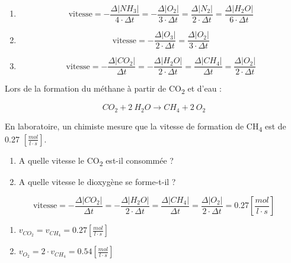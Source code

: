 \documentclass[
  11pt,
  a4paper,
  openany]{book}
\begin{document}
\begin{Answer}

\begin{enumerate}
\def\labelenumi{\arabic{enumi}.}
\item
  \[
  \text{vitesse} = - \frac{\Delta |NH_3|}{4 \cdot \Delta t} = - \frac{\Delta |O_2|}{3 \cdot \Delta t} = \frac{\Delta |N_2|}{2 \cdot \Delta t} = \frac{\Delta |H_2O|}{6 \cdot \Delta t}
  \]
\item
  \[
  \text{vitesse} = - \frac{\Delta |O_3|}{2 \cdot \Delta t} = \frac{\Delta |O_2|}{3 \cdot \Delta t}
  \]
\item
  \[
  \text{vitesse} = - \frac{\Delta |CO_2|}{\Delta t} = - \frac{\Delta |H_2O|}{2 \cdot \Delta t} = \frac{\Delta |CH_4|}{\Delta t} = \frac{\Delta |O_2|}{2 \cdot \Delta t}
  \]
\end{enumerate}

\end{Answer}

\begin{Exercise}

Lors de la formation du méthane à partir de CO\textsubscript{2} et d'eau :

\[ CO_2 + 2\ H_2O \rightarrow CH_4 + 2\ O_2 \]

En laboratoire, un chimiste mesure que la vitesse de formation de CH\textsubscript{4} est de 0.27 \(\left[\frac{mol}{l \cdot s}\right]\).

\begin{enumerate}
\def\labelenumi{\arabic{enumi}.}
\item
  A quelle vitesse le CO\textsubscript{2} est-il consommée ?
\item
  A quelle vitesse le dioxygène se forme-t-il ?
\end{enumerate}

\end{Exercise}

\begin{Answer}

\[
\text{vitesse} = - \frac{\Delta |CO_2|}{\Delta t} = - \frac{\Delta |H_2O|}{2 \cdot \Delta t} = \frac{\Delta |CH_4|}{\Delta t} = \frac{\Delta |O_2|}{2 \cdot \Delta t} = 0.27 \left[\frac{mol}{l \cdot s}\right]
\]

\begin{enumerate}
\def\labelenumi{\arabic{enumi}.}
\item
  \(v_{CO_2} = v_{CH_4} = 0.27 \left[\frac{mol}{l \cdot s}\right]\)
\item
  \(v_{O_2} = 2 \cdot v_{CH_4} = 0.54 \left[\frac{mol}{l \cdot s}\right]\)
\end{enumerate}

\newpage

\end{Answer}
\end{document}

